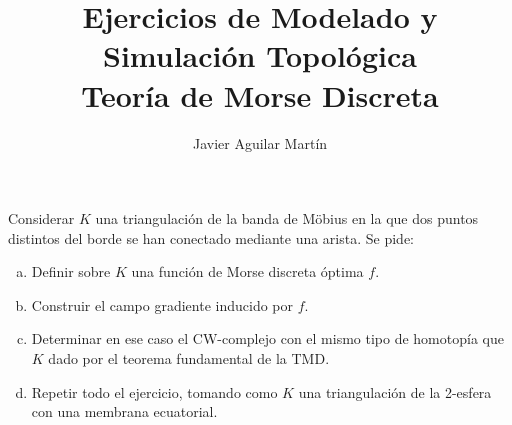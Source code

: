 \documentclass[twoside]{article}
\begin{document}
\title{Ejercicios de Modelado y Simulación Topológica\\ Teoría de Morse Discreta}
\author{Javier Aguilar Martín}
\maketitle

\begin{ejercicio}{1}
Considerar $K$ una triangulación de la banda de Möbius en la que dos puntos distintos del borde se han conectado mediante una arista. Se pide:
\begin{enumerate}[(a)]
\item Definir sobre $K$ una función de Morse discreta óptima $f$.
\item Construir el campo gradiente inducido por $f$. 
\item Determinar en ese caso el CW-complejo con el mismo tipo de homotopía que $K$ dado por el teorema fundamental de la TMD. 
\item Repetir todo el ejercicio, tomando como $K$ una triangulación de la 2-esfera con una membrana ecuatorial. 
\end{enumerate}
\end{ejercicio}
\end{document}
